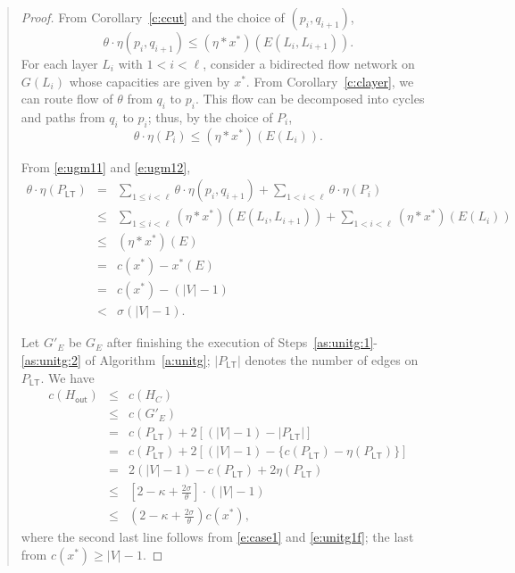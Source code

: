 \documentclass[11pt,letterpaper]{article}
\begin{document}
\begin{quote}
\begin{proof}
From Corollary~\ref{c:ccut} and the choice of $(p_i,q_{i+1})$,\begin{equation}\label{e:ugm11}
\theta\cdot\eta(p_i,q_{i+1})\leq (\eta\ast x^*)(E(L_i,L_{i+1}))
.\end{equation}For each layer $L_i$ with $1<i<\ell$, consider a bidirected flow network on $G(L_i)$ whose capacities are given by $x^*$. From Corollary~\ref{c:clayer}, we can route flow of $\theta$ from $q_i$ to $p_i$. This flow can be decomposed into cycles and paths from $q_i$ to $p_i$; thus, by the choice of $P_i$,\begin{equation}\label{e:ugm12}
\theta\cdot\eta(P_i)\leq (\eta\ast x^*)(E(L_i))
.\end{equation}

From \eqref{e:ugm11} and \eqref{e:ugm12},\begin{eqnarray}
\theta\cdot\eta(P_{\mathsf{LT}}) &=& \sum_{1\leq i<\ell} \theta\cdot \eta(p_i,q_{i+1}) + \sum_{1< i<\ell} \theta\cdot \eta(P_i)\nonumber\\
&\leq& \sum_{1\leq i<\ell} (\eta\ast x^*)(E(L_i,L_{i+1})) + \sum_{1< i<\ell} (\eta\ast x^*)(E(L_i))\nonumber\\
&\leq& (\eta\ast x^*)(E)\nonumber\\
&=&c(x^*)-x^*(E)\nonumber\\
&=&c(x^*)-(|V|-1)\nonumber\\
&<&\sigma(|V|-1)\label{e:unitg1f}
.\end{eqnarray}

Let $G'_E$ be $G_E$ after finishing the execution of Steps~\ref{as:unitg:1}-\ref{as:unitg:2} of Algorithm~\ref{a:unitg}; $|P_{\mathsf{LT}}|$ denotes the number of edges on $P_{\mathsf{LT}}$. We have\begin{eqnarray*}
c(H_{\mathsf{out}}) &\leq& c(H_C)\\
&\leq& c(G'_E)\\
&=& c(P_{\mathsf{LT}}) + 2\left[ (|V|-1)-|P_{\mathsf{LT}}| \right]\\
&=& c(P_{\mathsf{LT}}) + 2\left[ (|V|-1)-\{c(P_{\mathsf{LT}})-\eta(P_{\mathsf{LT}})\} \right]\\
&=& 2(|V|-1) -c(P_{\mathsf{LT}}) + 2\eta(P_{\mathsf{LT}})\\
&\leq& \left[ 2- \kappa +\frac{2\sigma}{\theta}\right] \cdot (|V|-1)\\
&\leq& \left( 2-\kappa+\frac{2\sigma}{\theta} \right) c(x^*)
,\end{eqnarray*}where the second last line follows from \eqref{e:case1} and \eqref{e:unitg1f}; the last from $c(x^*)\geq |V|-1$.


\end{proof}
\end{quote}
\end{document}
